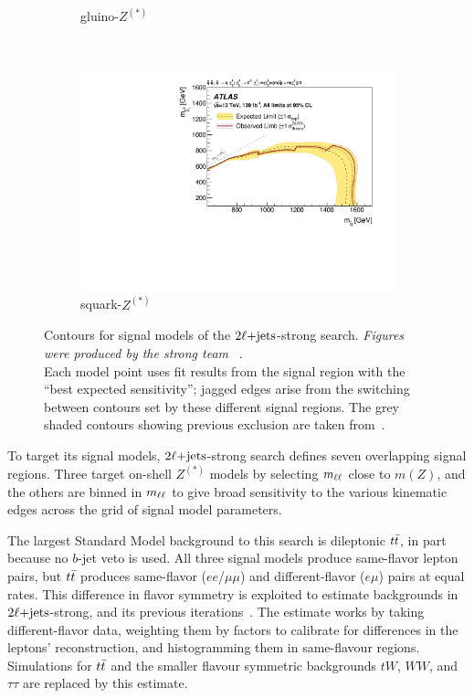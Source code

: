 \begin{figure}[tp]
\begin{subfigure}{0.49\textwidth}
    \caption{gluino-$Z^{(*)}$}
\end{subfigure}
\\[0.5em]
\begin{subfigure}{0.49\textwidth}
    \centering
    \includegraphics[width=\textwidth]{figures/2ljets_strong_contours_squark_z.pdf}
    \caption{squark-$Z^{(*)}$}
\end{subfigure}
\caption{%
Contours for signal models of the $2\ell\mathrm{+jets}$-strong search.
\emph{Figures were produced by the strong team%
}~\cite{atlas2022searches}.
\\[0.5em]
Each model point uses fit results from the signal region with the
``best expected sensitivity'';
jagged edges arise from the switching between contours set by these different
signal regions.
The grey shaded contours showing previous exclusion are taken
from~\cite{atlas_susy_strong_2l_partial_run2}.
}
\label{fig:2ljets_strong_contours}
\end{figure}

To target its signal models, $2\ell\mathrm{+jets}$-strong search defines seven
overlapping signal regions.
Three target on-shell $Z^{(*)}$ models by selecting $m_{\ell\ell}$ close to $m(Z)$,
and the others are binned in $m_{\ell\ell}$ to give broad sensitivity to the various
kinematic edges across the grid of signal model parameters.

The largest Standard Model background to this search is dileptonic $t\bar t$,
in part because no $b$-jet veto is used.
All three signal models produce same-flavor lepton pairs, but $t\bar t$
produces same-flavor ($ee$/$\mu\mu$) and different-flavor ($e\mu$) pairs at
equal rates.
This difference in flavor symmetry is exploited to estimate backgrounds in
$2\ell\mathrm{+jets}$-strong,
and its previous iterations~\cite{cms_susy_2016_strong_2l_run2_1}.
The estimate works by taking different-flavor data, weighting them by factors
to calibrate for differences in the leptons' reconstruction, and histogramming
them in same-flavour regions.
Simulations for $t\bar t$ and the smaller flavour symmetric backgrounds
$tW$, $WW$, and $\tau\tau$ are replaced by this estimate.

